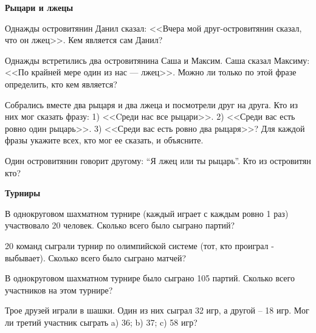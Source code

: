 \documentclass{article}
\begin{document}
    \begin{center}
        \textbf{Рыцари и лжецы}
    \end{center}

    \begin{enumerate_boxed}

        \item Однажды островитянин Данил сказал: <<Вчера мой друг-островитянин сказал, что он лжец>>.
        Кем является сам Данил?

        \item Однажды встретились два островитянина Саша и Максим.
        Саша сказал Максиму: <<По крайней мере один из нас — лжец>>.
        Можно ли только по этой фразе определить, кто кем является?

        \item Собрались вместе два рыцаря и два лжеца и посмотрели друг на друга.
        Кто из них мог сказать фразу: 1) <<Cреди нас все рыцари>>.
        2) <<Среди вас есть ровно один рыцарь>>.
        3) <<Среди вас есть ровно два рыцаря>>?
        Для каждой фразы укажите всех, кто мог ее сказать, и объясните.

        \item Один островитянин говорит другому: “Я лжец или ты рыцарь”.
        Кто из островитян кто?

    \end{enumerate_boxed}


    \begin{center}
        \textbf{Турниры}
    \end{center}

    \begin{enumerate_boxed}

        \item В однокруговом шахматном турнире (каждый играет с каждым ровно 1 раз) участвовало 20 человек.
        Сколько всего было сыграно партий?

        \item 20 команд сыграли турнир по олимпийской системе (тот, кто проиграл - выбывает).
        Сколько всего было сыграно матчей?

        \item В однокруговом шахматном турнире было сыграно 105 партий.
        Сколько всего участников на этом турнире?

        \item Трое друзей играли в шашки.
        Один из них сыграл 32 игр, а другой – 18 игр.
        Мог ли третий участник сыграть a) 36; b) 37; c) 58 игр?

    \end{enumerate_boxed}
\end{document}
